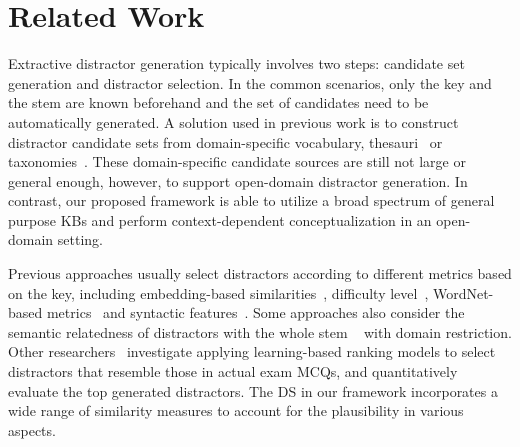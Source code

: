 \section{Related Work}
Extractive distractor generation typically involves two steps: 
candidate set generation and distractor selection.
In the common scenarios, only the key and the stem are known beforehand and the set of candidates need 
to be automatically generated. A solution used in previous work is to construct distractor 
candidate sets from domain-specific vocabulary, 
thesauri~\cite{sumita2005measuring,smith2010gap} 
or taxonomies~\cite{mitkov2009semantic}. 
These domain-specific candidate sources are still not large or general enough, however, 
to support open-domain distractor generation. In contrast, our proposed framework is able to utilize a broad spectrum of general purpose KBs and perform context-dependent conceptualization in an open-domain setting.

Previous approaches usually select distractors according to different metrics based on the key, including embedding-based similarities~\cite{guo2016questimator}, difficulty level~\cite{brown2005automatic,coniam2013preliminary}, WordNet-based metrics~\cite{mitkov2003computer} and 
syntactic features~\cite{agarwal2011automatic}.
Some approaches also consider the semantic relatedness of distractors with the whole stem ~\cite{pino2008selection,mostow2012generating} with domain restriction. Other researchers~\cite{liang2017distractor, liang2018distractor} investigate applying learning-based ranking models to select distractors that resemble those in actual exam MCQs, and quantitatively evaluate the top generated distractors. The DS in our framework incorporates a wide range of similarity measures to account for the plausibility in various aspects.


